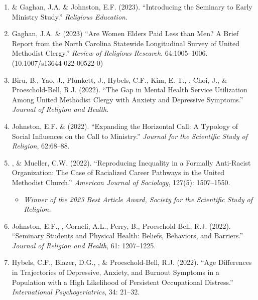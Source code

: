 \begin{enumerate}
\item \Eagle \hspace{.01em} \& Gaghan, J.A. \& Johnston, E.F. (2023). ``Introducing the Seminary to Early Ministry Study.''  \textit{Religious Education}. 

\item Gaghan, J.A. \& \Eagle \hspace{0.1em} (2023) ``Are Women Elders Paid Less than Men? A Brief Report from the North Carolina Statewide Longitudinal Survey of United Methodist Clergy.'' \textit{Review of Religious Research}. 64:1005--1006. \doi(10.1007/s13644-022-00522-0)
	
\item Biru, B., Yao, J., Plunkett, J., Hybels, C.F., Kim, E. T., \Eagle, Choi, J., \& Proeschold-Bell, R.J. (2022). ``The Gap in Mental Health Service Utilization Among United Methodist Clergy with Anxiety and Depressive Symptoms.'' \emph{Journal of Religion and Health}. 

\item Johnston, E.F. \& \Eagle  \hspace{.1em} (2022). ``Expanding the Horizontal Call: A Typology of Social Influences on the Call to Ministry.'' \emph{Journal for the Scientific Study of Religion}, 62:68--88.  

\item \Eagle, \& Mueller, C.W. \hspace{.1em} (2022). ``Reproducing Inequality in a Formally Anti-Racist Organization: The Case of Racialized Career Pathways in the United Methodist Church.'' \emph{American Journal of Sociology}, 127(5): 1507–1550.  \vspace{-.5em}
\begin{itemize}
	\item \textit{Winner of the 2023 Best Article Award, Society for the Scientific Study of Religion.}
\end{itemize}
\vspace{-.5em}

\item Johnston, E.F., \Eagle, Corneli, A.L., Perry, B., Proeschold-Bell, R.J.  (2022). ``Seminary Students and Physical Health: Beliefs, Behaviors, and Barriers.'' \emph{Journal of Religion and Health}, 61: 1207--1225. 

\item Hybels, C.F., Blazer, D.G., \Eagle, \& Proeschold-Bell, R.J. (2022). ``Age Differences in Trajectories of Depressive, Anxiety, and Burnout Symptoms in a Population with a High Likelihood of Persistent Occupational Distress.'' \emph{International Psychogeriatrics}, 34: 21--32. 


\end{enumerate}
